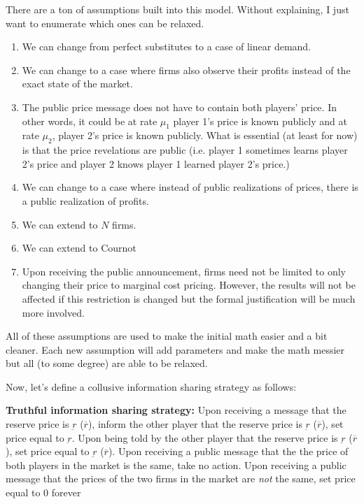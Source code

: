 \documentclass{article}
\begin{document}
There are a ton of assumptions built into this model.  Without
explaining, I just want to enumerate which ones can be relaxed.
\begin{enumerate}
  \item We can change from perfect substitutes to a case of linear
    demand.
  \item We can change to a case where firms also observe their profits
    instead of the exact state of the market.
  \item The public price message does not have to contain both players'
    price.  In other words, it could be at rate $\mu_1$ player 1's
    price is known publicly and at rate $\mu_2$, player 2's price is
    known publicly.  What is essential (at least for now) is that the
    price revelations are public (i.e. player 1 sometimes learns
    player 2's price and player 2 knows player 1 learned player 2's
    price.)
 \item We can change to a case where instead of public realizations of
   prices, there is a public realization of profits.
 \item We can extend to $N$ firms.
 \item We can extend to Cournot
 \item Upon receiving the public announcement, firms need not be
   limited to only changing their price to marginal cost pricing.
   However, the results will not be affected if this restriction is
   changed but the formal justification will be much more involved.  
\end{enumerate}
All of these assumptions are used to make the initial math easier and
a bit cleaner.  Each new assumption will add parameters and make the
math messier but all (to some degree) are able to be relaxed.

Now, let's define a collusive information sharing strategy as follows:

\noindent \textbf{Truthful information sharing strategy:} Upon receiving a
message that the reserve price is $\underbar{r}$ ($\overline{r}$), inform the other
player that the reserve price is $\underbar{r}$ ($\overline{r}$), set
price equal to $\underbar{r}$.  Upon being told by the other player
that the reserve price is  $\underbar{r}$ ($\overline{r}$), set price
equal to $\underbar{r}$ ($\overline{r}$).  Upon receiving a public
message that the the price of both players in the market is the same,
take no action.  Upon receiving a public message that the prices of
the two firms in the market are \emph{not} the same, set price equal
to $0$ forever
\end{document}
